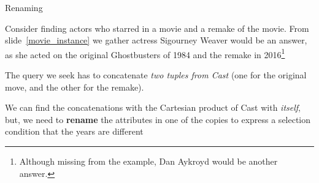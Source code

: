 \documentclass[xcolor={usenames,dvipsnames}]{beamer}
\begin{document}
%
%
\begin{frame}{Renaming} %

Consider finding actors who starred in a movie and a remake of the movie. From slide~\ref{movie_instance} we gather actress Sigourney Weaver would be an answer, as she acted on the original Ghostbusters of 1984 and the remake in 2016\footnote{Although missing from the example, Dan Aykroyd would be another answer.}

The query we seek has to concatenate \emph{two tuples from Cast} (one for the original move, and the other for the remake).

We can find the concatenations with the Cartesian product of Cast with \emph{itself}, but, we need to \textbf{rename} the attributes in one of the copies to express a selection condition that the years are different

\begin{center}
\scalebox{0.7}{\usebox\SelfJoinExampleSigourneyWeaver}
\end{center}
\end{frame} %


%
%
\end{document}

